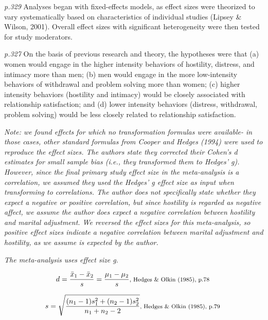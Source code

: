 \documentclass{article}
\begin{document}
\textit{p.329} Analyses began with fixed-effects models, as effect sizes were theorized to vary systematically based on characteristics of individual studies (Lipsey \& Wilson, 2001). Overall effect sizes with significant heterogeneity were then tested for study moderators.

\textit{p.327} On the basis of previous research and theory, the hypotheses were that (a) women would engage in the higher intensity behaviors of hostility, distress, and intimacy more than men; (b) men would engage in the more low-intensity behaviors of withdrawal and problem solving more than women; (c) higher intensity behaviors (hostility and intimacy) would be closely associated with relationship satisfaction; and (d) lower intensity behaviors (distress, withdrawal, problem solving) would be less closely related to relationship satisfaction.

\vspace{3 mm}
\textit{Note: we found effects for which no transformation formulas were available- in those cases, other standard formulas from Cooper and Hedges (1994) were used to reproduce the effect sizes. The authors state they corrected their Cohen's d estimates for small sample bias (i.e., they transformed them to Hedges' g). However, since the final primary study effect size in the meta-analysis is a correlation, we assumed they used the Hedges' g effect size as input when transforming to correlations. The author does not specifically state whether they expect a negative or positive correlation, but since hostility is regarded as negative affect, we assume the author does expect a negative correlation between hostility and marital adjustment. We reversed the effect sizes for this meta-analysis, so positive effect sizes indicate a negative correlation between marital adjustment and hostility, as we assume is expected by the author.}

\vspace{3mm}
\textit{The meta-analysis uses effect size g.}

\begin{equation*}
d={\frac {{\bar {x}}_{1}-{\bar {x}}_{2}}{s}}={\frac {\mu_{1}-\mu_{2}}{s}}  \mbox {\footnotesize, Hedges \& Olkin (1985), p.78 } 
\end{equation*}

\begin{equation*}
s={\sqrt {\frac {(n_{1}-1)s_{1}^{2}+(n_{2}-1)s_{2}^{2}}{n_{1}+n_{2}-2}}} \mbox{\footnotesize, Hedges \& Olkin (1985), p.79 } 
\end{equation*}
\end{document}
